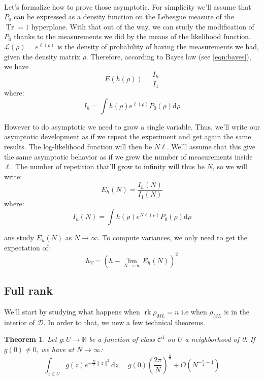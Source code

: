 \documentclass[10pt,a4paper]{report}
\theoremstyle{plain}
\newtheorem{thm}{Theorem}[chapter]
\theoremstyle{definition}
\theoremstyle{remark}
\newcommand{\R}{\ensuremath{\mathbb{R}}}
\newcommand{\dd}{\mathrm{d}}
\DeclareMathOperator{\Tr}{Tr}
\DeclareMathOperator{\rk}{rk}
\newcommand{\class}[1]{{\mathscr{C}^{#1}}}
\newcommand{\ml}{_{M\!L}}
\begin{document}
\

Let's formalize how to prove those asymptotic. For simplicity we'll assume that
$P_0$ can be expressed as a density function on the Lebesgue measure of the
$\Tr = 1$ hyperplane. With that out of the way, we can study the modification of
$P_0$ thanks to the measurements we did by the means of the likelihood function.
$\mathcal{L}(\rho) = e^{\ell(\rho)}$ is the density of probability of having
the measurements we had, given the density matrix $\rho$. Therefore, according to
Bayes law (see \cref{eqn:bayes}), we have
\[E(h(\rho)) = \frac{I_h}{I_1}\]
where:
\[I_h = \int h(\rho) e^{\ell(\rho)} P_0(\rho) \dd \rho \]

However to do asymptotic we need to grow a single variable. Thus, we'll write our
asymptotic development as if we repeat the experiment and get again the same
results. The log-likelihood function will then be $N\ell$. We'll assume that this
give the same asymptotic behavior as if we grew the number of measurements inside
$\ell$. The number of repetition that'll grow to infinity will thus be $N$, so we
will write:
\[E_h(N) = \frac{I_h(N)}{I_1(N)}\]
where:
\[I_h(N) = \int h(\rho) e^{N\ell(\rho)} P_0(\rho) \dd \rho \]

ans study $E_h(N)$ as $N \to \infty$. To compute variances, we only need to get
the expectation of:
\[h_V = \left(h - \lim_{N \to \infty} E_h(N)\right)^2\]



\subsection{Full rank}

We'll start by studying what happens when $\rk \rho\ml = n$ i.e when $\rho\ml$
is in the interior of $\mathcal{D}$. In order to that, we new a few technical theorems.

\begin{thm}\label{thm:asy1}
  Let $g : U \to \R$ be a function of class $\class 1$ on $U$ a neighborhood of 0. If $g(0)
  \neq 0$, we have at $N \to \infty$:
  \[\int_{z \in U} g(z)e^{-\frac N2\|z\|^2} \dd z = g(0){\left(\frac
      {2\pi}{N}\right)}^{\frac n 2} +
    O\left({N^{-\frac n 2 -1}}\right)\]
\end{thm}
\end{document}
